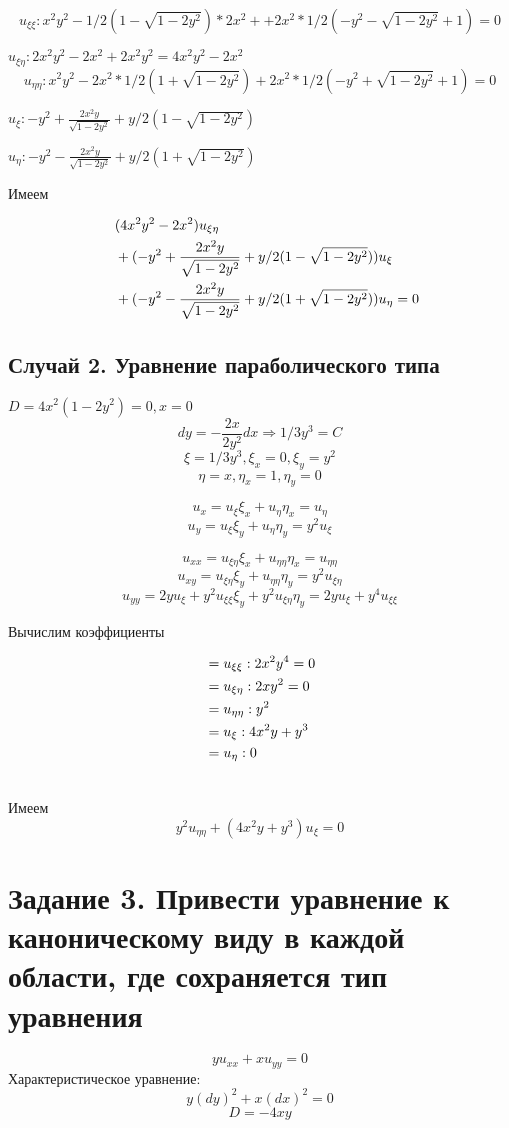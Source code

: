 \documentclass[a4paper,12pt]{article}
\begin{document}
$$u_{\xi\xi} : x^2y^2 - 1/2(1 - \sqrt{1-2y^2})*2x^2 + 
+ 2x^2*1/2(-y^2 - \sqrt{1-2y^2} + 1) = 0$$

$u_{\xi\eta} : 2x^2y^2 - 2x^2 + 2x^2y^2 = 4x^2y^2 - 2x^2$
$$u_{\eta\eta} : x^2y^2 - 2x^2*1/2(1+\sqrt{1-2y^2}) + 2x^2*1/2(-y^2 + \sqrt{1-2y^2} + 1) = 0$$

$u_\xi : -y^2 + \frac{2x^2y}{\sqrt{1-2y^2}} + y/2(1-\sqrt{1-2y^2})$

$u_\eta : -y^2 - \frac{2x^2y}{\sqrt{1-2y^2}} + y/2(1+\sqrt{1-2y^2})$

Имеем

\begin{align}
    &\quad(4x^2y^2 - 2x^2)u_{\xi\eta} \notag \\
    &\quad+ (-y^2 + \frac{2x^2y}{\sqrt{1-2y^2}} + y/2(1-\sqrt{1-2y^2}))u_\xi \notag \\
    &\quad+ (-y^2 - \frac{2x^2y}{\sqrt{1-2y^2}} + y/2(1+\sqrt{1-2y^2}))u_\eta = 0
\end{align}

\subsection{Случай 2. Уравнение параболического типа}
$D = 4x^2(1-2y^2) = 0, x = 0$
$$dy = -\frac{2x}{2y^2}dx \Rightarrow 1/3y^3 = C$$
$$\xi = 1/3y^3, \xi_x = 0, \xi_y = y^2$$
$$\eta = x, \eta_x = 1, \eta_y = 0$$

$$u_x = u_\xi\xi_x + u_\eta\eta_x = u_\eta$$
$$u_y = u_\xi\xi_y + u_\eta\eta_y = y^2u_\xi$$

$$u_{xx} = u_{\xi\eta}\xi_x + u_{\eta\eta}\eta_x = u_{\eta\eta}$$
$$u_{xy} = u_{\xi\eta}\xi_y + u_{\eta\eta}\eta_y = y^2u_{\xi\eta}$$
$$u_{yy} = 2yu_\xi + y^2u_{\xi\xi}\xi_y + y^2u_{\xi\eta}\eta_y = 2yu_\xi + y^4u_{\xi\xi}$$

Вычислим коэффициенты

\begin{align}
&=u_{\xi\xi} : 2x^2y^4 = 0 \\ \notag
&=u_{\xi\eta}: 2xy^2 = 0 \\ \notag
&=u_{\eta\eta}: y^2 \\ \notag
&=u_\xi: 4x^2y + y^3 \\ \notag
&=u_\eta: 0 \\ \notag
\end{align}

Имеем
$$y^2u_{\eta\eta} + (4x^2y + y^3)u_\xi = 0$$

\section{Задание 3. Привести уравнение к каноническому виду в каждой области, где сохраняется тип уравнения}
$$yu_{xx} + xu_{yy} = 0$$
Характеристическое уравнение:
$$y(dy)^2 + x(dx)^2 = 0$$
$$D = -4xy$$
\end{document}
